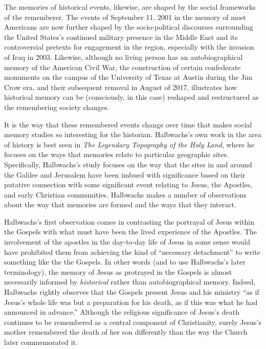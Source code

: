 The memories of historical events, likewise, are shaped by the social
frameworks of the rememberer. The events of September 11, 2001 in the
memory of most Americans are now further shaped by the socio-political
discourses surrounding the United States's continued military presence
in the Middle East and its controversial pretexts for engagement in the
region, especially with the invasion of Iraq in 2003. Likewise, although
no living person has an autobiographical memory of the American Civil
War, the construction of certain confederate monuments on the campus of
the University of Texas at Austin during the Jim Crow era, and their
subsequent removal in August of 2017, illustrates how historical memory
can be (consciously, in this case) reshaped and restructured as the
remembering society changes.

It is the way that these remembered events change over time that makes
social memory studies so interesting for the historian. Halbwachs's own
work in the area of history is best seen in \emph{The Legendary
Topography of the Holy Land}, where he focuses on the ways that memories
relate to particular geographic sites. Specifically, Halbwachs's study
focuses on the way that the sites in and around the Galilee and
Jerusalem have been imbued with significance based on their putative
connection with some significant event relating to Jesus, the Apostles,
and early Christian communities. Halbwachs makes a number of
observations about the way that memories are formed and the ways that
they interact.

Halbwachs's first observation comes in contrasting the portrayal of
Jesus within the Gospels with what must have been the lived experience
of the Apostles.\autocite[193--198]{halbwachs1992} The involvement of
the apostles in the day-to-day life of Jesus in some sense would have
prohibited them from achieving the kind of ``necessary detachment'' to
write something like the the Gospels. In other words (and to use
Halbwachs's later terminology), the memory of Jesus as protrayed in the
Gospels is almost necessarily informed by \emph{historical} rather than
autobiographical memory.\autocite[194]{halbwachs1992} Indeed, Halbwachs
rightly observes that the Gospels present Jesus and his ministry ``as if
Jesus's whole life was but a preparation for his death, as if this was
what he had announced in advance.''\autocite[198]{halbwachs1992}
Although the religious significance of Jesus's death continues to be
remembered as a central component of Christianity, surely Jesus's mother
remembered the death of her son differently than the way the Church
later commemorated it.\autocites[Regardless of whether Halbwachs's
conception of Early Christianity would be considered sound today, the
idea that the Gospels represent several collective remembrances of
Jesus's life, ministry and death each bearing marks from their own
\emph{Sitz im Leben} (to borrow from the form critics) seems relatively
uncontroversial. A number of studies on the Jesus and early Christian
memory have come about in the past several years.
See][]{ledonne2009}{rodriguez2010}[For an overview of the modern impact
of Halbwachs (and memory studies more generally) on the field of
Historical Jesus studies, see][]{keith_ec2015}[and][]{keith_ec2015b}

